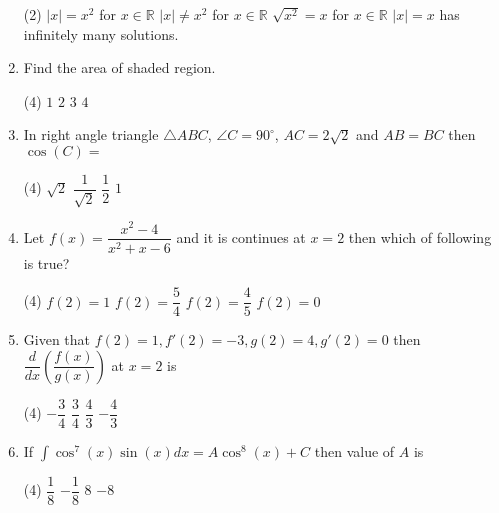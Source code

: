 \documentclass{article}
\renewcommand{\frac}{\dfrac}
\begin{document}
\begin{enumerate}
        \begin{tasks}(2)
            	\task $|x| = x^2$ for $x\in \mathbb{R}$
            	\task $|x| \neq x^2$ for $x\in \mathbb{R}$
            	\task $\sqrt{x^2} = x$ for $x\in \mathbb{R}$
            	\task $|x| = x$ has infinitely many solutions.\ans
        \end{tasks}
    \item Find the area of shaded region.
    \begin{center}
    \end{center}
        \begin{tasks}(4)
            	\task $1$\ans
            	\task $2$
            	\task $3$
            	\task $4$
        \end{tasks}
    \item In right angle triangle $\triangle ABC$, $\angle C=90^\circ$, $AC = 2\sqrt{2}$ and $AB = BC$ then $\cos(C) =$
        \begin{tasks}(4)
            	\task $\sqrt{2}$
            	\task $\frac{1}{\sqrt{2}}$\ans
            	\task $\frac{1}{2}$
            	\task $1$
        \end{tasks}
    \item Let $f(x) = \frac{x^2-4}{x^2+x-6}$ and it is continues at $x=2$ then which of following is true?
        \begin{tasks}(4)
            	\task $f(2) = 1$
            	\task $f(2) = \frac{5}{4}$
            	\task $f(2) = \frac{4}{5}$\ans
            	\task $f(2) = 0$
        \end{tasks}
    \item Given that $f(2) = 1, f'(2) = -3, g(2) = 4, g'(2) = 0$ then $\frac{d}{dx}\left(\frac{f(x)}{g(x)}\right)$ at $x=2$ is
        \begin{tasks}(4)
            	\task $-\frac{3}{4}$\ans
            	\task $\frac{3}{4}$
            	\task $\frac{4}{3}$
            	\task $-\frac{4}{3}$
        \end{tasks}
    \item If $\int \cos^7(x) \sin(x) dx = A \cos^8(x) + C$ then value of $A$ is
        \begin{tasks}(4)
            	\task $\frac{1}{8}$
            	\task $-\frac{1}{8}$\ans
            	\task $8$
            	\task $-8$
        \end{tasks}


\end{enumerate}
\end{document}
